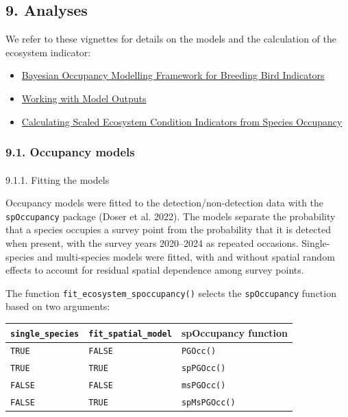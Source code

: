 \documentclass[
  letterpaper,
  DIV=11,
  numbers=noendperiod]{scrartcl}
\makeatletter
\let\oldparagraph\paragraph
\renewcommand{\paragraph}{
    \@ifstar
      \xxxParagraphStar
      \xxxParagraphNoStar
  }
\newcommand{\xxxParagraphStar}[1]{\oldparagraph*{#1}\mbox{}}
\newcommand{\xxxParagraphNoStar}[1]{\oldparagraph{#1}\mbox{}}
\newcounter{none} %
\providecommand{\tightlist}{%
  \setlength{\itemsep}{0pt}\setlength{\parskip}{0pt}}
\makeatother
\begin{document}
\subsection{9. Analyses}\label{analyses}

We refer to these vignettes for details on the models and the
calculation of the ecosystem indicator:

\begin{itemize}
\tightlist
\item
  \href{https://github.com/NINAnor/breedingBirdIndicator_OccupancyModelling/blob/main/vignettes/occupancy_modelling.qmd}{Bayesian
  Occupancy Modelling Framework for Breeding Bird Indicators}
\item
  \href{https://github.com/NINAnor/breedingBirdIndicator_OccupancyModelling/blob/main/vignettes/postProcessing_outputs.qmd}{Working
  with Model Outputs}
\item
  \href{https://github.com/NINAnor/breedingBirdIndicator_OccupancyModelling/blob/main/vignettes/indicator_estimation.qmd}{Calculating
  Scaled Ecosystem Condition Indicators from Species Occupancy}
\end{itemize}

\subsubsection{9.1. Occupancy models}\label{occupancy-models}

\paragraph{9.1.1. Fitting the models}\label{fitting-the-models}

Occupancy models were fitted to the detection/non-detection data with
the \texttt{spOccupancy} package (Doser et al. 2022). The models
separate the probability that a species occupies a survey point from the
probability that it is detected when present, with the survey years
2020--2024 as repeated occasions. Single-species and multi-species
models were fitted, with and without spatial random effects to account
for residual spatial dependence among survey points.

The function \texttt{fit\_ecosystem\_spoccupancy()} selects the
\texttt{spOccupancy} function based on two arguments:

{\def\LTcaptype{none} %
\begin{longtable}[]{@{}lll@{}}
\toprule\noalign{}
\texttt{single\_species} & \texttt{fit\_spatial\_model} & spOccupancy
function \\
\midrule\noalign{}
\endhead
\bottomrule\noalign{}
\endlastfoot
\texttt{TRUE} & \texttt{FALSE} & \texttt{PGOcc()} \\
\texttt{TRUE} & \texttt{TRUE} & \texttt{spPGOcc()} \\
\texttt{FALSE} & \texttt{FALSE} & \texttt{msPGOcc()} \\
\texttt{FALSE} & \texttt{TRUE} & \texttt{spMsPGOcc()} \\
\end{longtable}
}
\end{document}
